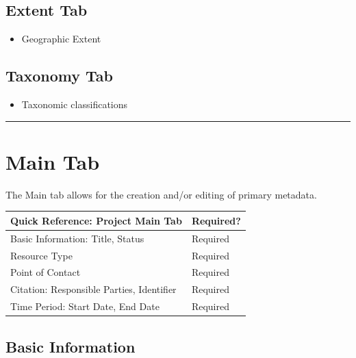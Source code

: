 \documentclass[
]{book}
\providecommand{\tightlist}{%
  \setlength{\itemsep}{0pt}\setlength{\parskip}{0pt}}
\begin{document}
\hypertarget{extent-tab}{%
\subsection*{Extent Tab}\label{extent-tab}}

\begin{itemize}
\tightlist
\item
  Geographic Extent
\end{itemize}

\hypertarget{taxonomy-tab}{%
\subsection*{Taxonomy Tab}\label{taxonomy-tab}}

\begin{itemize}
\tightlist
\item
  Taxonomic classifications
\end{itemize}

\begin{center}\rule{0.5\linewidth}{\linethickness}\end{center}

\hypertarget{project-main}{%
\section*{Main Tab}\label{project-main}}

The Main tab allows for the creation and/or editing of primary metadata.

\begin{longtable}[]{@{}ll@{}}
\toprule
Quick Reference: Project Main Tab & Required?\tabularnewline
\midrule
\endhead
Basic Information: Title, Status & Required\tabularnewline
Resource Type & Required\tabularnewline
Point of Contact & Required\tabularnewline
Citation: Responsible Parties, Identifier & Required\tabularnewline
Time Period: Start Date, End Date & Required\tabularnewline
\bottomrule
\end{longtable}

\hypertarget{basic-information}{%
\subsection*{Basic Information}\label{basic-information}}
\end{document}
